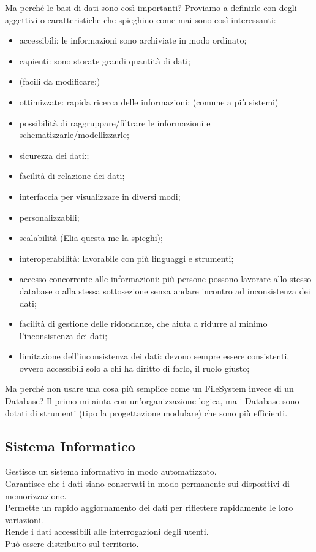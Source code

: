 Ma perché le basi di dati sono così importanti? Proviamo a definirle con degli aggettivi o caratteristiche che spieghino come mai sono così interessanti:
\begin{itemize}
    \item accessibili: le informazioni sono archiviate in modo ordinato;
    \item capienti: sono storate grandi quantità di dati;
    \item (facili da modificare;)
    \item ottimizzate: rapida ricerca delle informazioni; (comune a più sistemi)
    \item possibilità di raggruppare/filtrare le informazioni e schematizzarle/modellizzarle;
    \item sicurezza dei dati:;
    \item facilità di relazione dei dati;
    \item interfaccia per visualizzare in diversi modi;
    \item personalizzabili;
    \item scalabilità (Elia questa me la spieghi);
    \item interoperabilità: lavorabile con più linguaggi e strumenti;
    \item accesso concorrente alle informazioni: più persone possono lavorare allo stesso database o alla stessa sottosezione senza andare incontro ad inconsistenza dei dati;
    \item facilità di gestione delle ridondanze, che aiuta a ridurre al minimo l'inconsistenza dei dati;
    \item limitazione dell'inconsistenza dei dati: devono sempre essere consistenti, ovvero accessibili solo a chi ha diritto di farlo, il ruolo giusto;
\end{itemize}
Ma perché non usare una cosa più semplice come un FileSystem invece di un Database? Il primo mi aiuta con un'organizzazione logica, ma i Database sono dotati  di strumenti (tipo la progettazione modulare) che sono più efficienti.

\subsection{Sistema Informatico}
Gestisce un sistema informativo in modo automatizzato.
\\Garantisce che i dati siano conservati in modo permanente sui dispositivi di memorizzazione.
\\Permette un rapido aggiornamento dei dati per riflettere rapidamente le loro variazioni.
\\Rende i dati accessibili alle interrogazioni degli utenti.
\\Può essere distribuito sul territorio.

